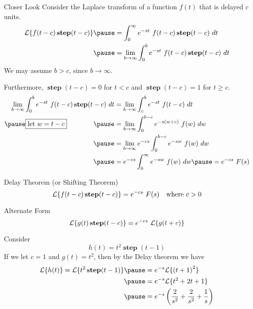 \documentclass{beamer}
\DeclareMathOperator{\step}{\textbf{step}}
\begin{document}
\begin{frame}
\small
\begin{block}{Closer Look}
Consider the Laplace transform of a function $f(t)$ that is delayed $c$ units.
\begin{equation*}
\begin{aligned}
\laplace\{f(t-c)\step(t-c)\}\pause
&=\int_0^\infty e^{-st}~f(t-c)\step(t-c)~dt\\\pause
&=\lim_{b\rightarrow\infty}\int_0^b e^{-st}~f(t-c)\step(t-c)~dt
\end{aligned}
\end{equation*}\pause
We may assume $b>c$, since $b\rightarrow\infty$.\pause 

\vspace{2mm}
Furthermore, $\step(t-c)=0$ for $t<c$ and $\step(t-c)=1$ for $t\geq c$.\pause
\begin{equation*}
\begin{aligned}
\lim_{b\rightarrow\infty}\int_0^b e^{-st}~f(t-c)\step(t-c)~dt
&= \lim_{b\rightarrow\infty}\int_c^b e^{-st}~f(t-c)~dt\\\pause
\framebox{\text{let $w=t-c$}}\qquad\qquad\pause&= \lim_{b\rightarrow\infty}\int_0^{b-c} e^{-s(w+c)}~f(w)~dw\\\pause
&=\lim_{b\rightarrow\infty}e^{-cs} \int_0^{b-c} e^{-sw}~f(w)~dw\\\pause
&=e^{-cs}\int_0^\infty e^{-sw}~f(w)~dw\pause
=e^{-cs}~F(s)
\end{aligned}
\end{equation*}
\end{block}
\end{frame}

\begin{frame}
\begin{block}{Delay Theorem (or Shifting Theorem)}
\begin{equation*}
\laplace\{f(t-c)\step(t-c)\}=e^{-cs}~F(s)
\quad\text{where}~c>0
\end{equation*}
\end{block}\pause
\begin{block}{Alternate Form}
\begin{equation*}
\laplace\{g(t)\step(t-c)\}=e^{-cs}~\laplace\{g(t+c)\}
\end{equation*}
\end{block}\pause
\begin{example}
Consider
\begin{equation*}
h(t)=t^2\step(t-1)
\end{equation*}\pause
If we let $c=1$ and $g(t)=t^2$, then by the Delay theorem we have
\begin{equation*}
\begin{aligned}
\laplace\{h(t)\}=\laplace\{t^2\step(t-1)\}\pause
&= e^{-s}\laplace\{{(t+1)}^2\}\\\pause
&= e^{-s}\laplace\{t^2+2t+1\}\\\pause
&= e^{-s}\left(\dfrac{2}{s^2}+\dfrac{2}{s^2}+\dfrac{1}{s}\right)
\end{aligned}
\end{equation*}
\end{example}
\end{frame}
\end{document}
